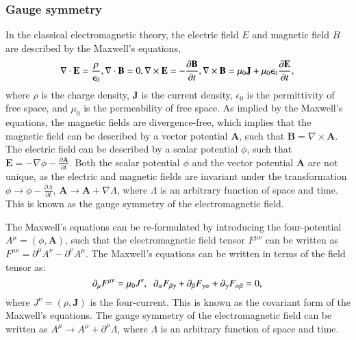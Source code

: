         \subsubsection{Gauge symmetry}
            In the classical electromagnetic theory, the electric field $E$ and magnetic field $B$ are
            described by the Maxwell's equations,
            \begin{equation}
                \nabla \cdot \mathbf{E} = \frac{\rho}{\epsilon_0}, \\
                \nabla \cdot \mathbf{B} = 0,\\
                \nabla \times \mathbf{E} = -\frac{\partial \mathbf{B}}{\partial t},\\
                \nabla \times \mathbf{B} = \mu_0 \mathbf{J} + \mu_0 \epsilon_0 \frac{\partial \mathbf{E}}{\partial t},\\
            \end{equation}
            where $\rho$ is the charge density, $\mathbf{J}$ is the current density, 
            $\epsilon_0$ is the permittivity of free space, 
            and $\mu_0$ is the permeability of free space. 
            As implied by the Maxwell's equations, the magnetic fields
            are divergence-free, which implies that the magnetic field 
            can be described by a vector potential $\mathbf{A}$, such that
            $\mathbf{B} = \nabla \times \mathbf{A}$. The electric field
            can be described by a scalar potential $\phi$, such that
            $\mathbf{E} = -\nabla \phi - \frac{\partial \mathbf{A}}{\partial t}$.
            Both the scalar potential $\phi$ and the vector potential $\mathbf{A}$
            are not unique, as the electric and magnetic fields are invariant under
            the transformation $\phi \rightarrow \phi - \frac{\partial \Lambda}{\partial t}$,
            $\mathbf{A} \rightarrow \mathbf{A} + \nabla \Lambda$, where $\Lambda$ is an arbitrary
            function of space and time. This is known as the gauge symmetry of the electromagnetic field.

            The Maxwell's equations can be re-formulated by introducing the four-potential 
            $A^{\mu} = (\phi, \mathbf{A})$, such that the electromagnetic field tensor $F^{\mu\nu}$
            can be written as $F^{\mu\nu} = \partial^{\mu}A^{\nu} - \partial^{\nu}A^{\mu}$.
            The Maxwell's equations can be written in terms of the field tensor as:
            \begin{equation}
                \partial_{\mu}F^{\mu\nu} = \mu_0 J^{\nu},\hspace{0.2cm} 
                \partial_{\alpha} F_{\beta \gamma} + \partial_{\beta} F_{\gamma \alpha} + \partial_{\gamma} F_{\alpha \beta} = 0,\\
            \end{equation}
            where $J^{\nu} = (\rho, \mathbf{J})$ is the four-current. This is known as the covariant
            form of the Maxwell's equations. The gauge symmetry of the
            electromagnetic field can be written as $A^{\mu} \rightarrow A^{\mu} + \partial^{\mu}\Lambda$,
            where $\Lambda$ is an arbitrary function of space and time. 

